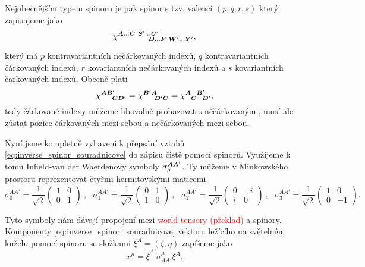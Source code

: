 Nejobecnějším typem spinoru je pak spinor s tzv. valencí $(p, q; r, s)$ který zapisujeme jako
\begin{equation}
    \chi^{{\boldsymbol{A}}\dots {\boldsymbol{C}} ~\boldsymbol{S}'\dots \boldsymbol{U}'}_{~~~~~~~~~~~{\boldsymbol{D}}\dots \boldsymbol{F}~ \boldsymbol{W}'\dots \boldsymbol{Y}'},
\end{equation}

který má $p$ kontravariantních nečárkovaných indexů, $q$ kontravariantních čárkovaných indexů, $r$
kovariantních nečárkovaných indexů a $s$ kovariantních čarkovaných indexů. Obecně platí
\begin{equation}
    \chi^{{\boldsymbol{A}}{\boldsymbol{B}}'}_{~~~~{\boldsymbol{C}}{\boldsymbol{D}}'} = \chi^{{\boldsymbol{B}}'{\boldsymbol{A}}}_{~~~~{\boldsymbol{D}}'{\boldsymbol{C}}} = \chi^{{\boldsymbol{A}}~~{\boldsymbol{B}}'}_{~~{\boldsymbol{C}}~~{\boldsymbol{D}}'},
\end{equation}
tedy čárkované indexy můžeme libovolně prohazovat s něčárkovanými, musí ale zůstat pozice čárkovaných mezi sebou
a nečárkovaných mezi sebou.

Nyní jsme kompletně vybaveni k přepsání vztahů \ref{eq:inverse_spinor_souradnicove} do zápisu čistě pomocí spinorů.
Využijeme k tomu Infield-van der Waerdenovy symboly $\sigma_\mu^{{\boldsymbol{A}}{\boldsymbol{A}}'}$. Ty můžeme v Minkowského prostoru reprezentovat
čtyřmi hermitovskými maticemi
\begin{equation} \scriptstyle
    \sigma_0^{AA'}=\frac{1}{\sqrt{2}}\left(\begin{smallmatrix}
        1 & 0 \\
        0 & 1
    \end{smallmatrix}\right)~,~~~ \sigma_1^{AA'}=\frac{1}{\sqrt{2}}\left(\begin{smallmatrix}
        0 & 1 \\
        1 & 0
    \end{smallmatrix}\right)~,~~~ \sigma_2^{AA'}=\frac{1}{\sqrt{2}}\left(\begin{smallmatrix}
        0 & -i \\
        i & 0
    \end{smallmatrix}\right)~,~~~ \sigma_3^{AA'}=\frac{1}{\sqrt{2}}\left(\begin{smallmatrix}
        1 & 0 \\
        0 & -1
    \end{smallmatrix}\right).
\end{equation}

Tyto symboly nám dávají propojení mezi \textcolor{red}{world-tensory (překlad)} a spinory. Komponenty
\ref{eq:inverse_spinor_souradnicove} vektoru ležícího na světelném kuželu pomocí spinoru se
složkami $\xi^A=(\zeta, \eta)$ zapíšeme jako
\begin{equation}
    x^\mu = \bar{\xi}^{A'} \sigma_{AA'}^\mu \xi^A.
\end{equation}


